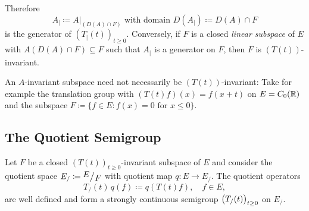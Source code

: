Therefore
\[
    A_{|} \coloneq A\big|_{ (D(A)\cap F)} \text{ with domain } D(A_{|}) \coloneq D(A) \cap F
\]
is the generator of\/ $(T_{\vert}(t))_{t \geq 0}$.
%
Conversely, if\/ $F$ is a closed \emph{linear subspace} of\/ $E$ with $A(D(A) \cap F) \subseteq F$ such that 
$A_{|}$ is a generator on $F$, then $F$ is $(T(t))$-invariant.

An $A$-invariant subspace need not necessarily be $(T(t))$-invariant:
Take for example the translation group with $(T(t)f)(x) = f(x+t)$ on $E = C_{0}(\mathbb{R})$ and the subspace $F \coloneq \{f \in E \colon f(x) = 0 \text{ for } x \leq 0\}$.
\subsection{The Quotient Semigroup}\label{subsec:a1-3.4}%
Let $F$ be a closed $(T(t))_{t \geq 0}$-invariant subspace of $E$ and consider the quotient space $E_{/} \coloneq \mfrac{E}{F}$ with quotient map $q \colon E \to E_{/}$.
The quotient operators
\[
    T_{/}(t)\,q(f) \coloneq q(T(t)f), \quad f \in E,
\]
are well defined and form a strongly continuous semigroup $\mleft(T_{/}(t)\mright)_{t \geq 0}$ on $E_{/}$.

